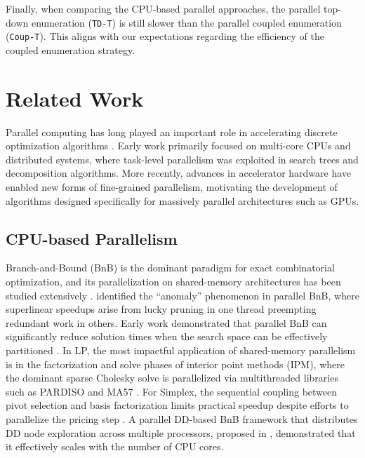\documentclass[letterpaper]{article}
\begin{document}
Finally, when comparing the CPU-based parallel approaches, the parallel top-down enumeration (\texttt{TD-T}) is still slower than the parallel coupled enumeration (\texttt{Coup-T}). This aligns with our expectations regarding the efficiency of the coupled enumeration strategy.

\section{Related Work}
\label{sec:related}
Parallel computing has long played an important role in accelerating discrete optimization algorithms \cite{kindervater1986introduction}.
Early work primarily focused on multi-core CPUs and distributed systems,
where task-level parallelism was exploited in search trees and
decomposition algorithms.
More recently, advances in accelerator hardware have enabled new forms of
fine-grained parallelism, motivating the development of algorithms designed
specifically for massively parallel architectures such as GPUs.

\subsection{CPU-based Parallelism}
Branch-and-Bound (BnB) is the dominant paradigm for exact combinatorial optimization, and its parallelization on shared-memory architectures has been studied extensively \cite{gendron1994parallel, achterberg2009scip}. \cite{lai1984anomalies} identified the ``anomaly'' phenomenon in parallel BnB, where superlinear speedups arise from lucky pruning in one thread preempting redundant work in others. Early work demonstrated that parallel BnB can significantly reduce solution times when the search space can be effectively partitioned \cite{ralphs2003parallel, linderoth2003decomposition}. In LP, the most impactful application of shared-memory parallelism is in the factorization and solve phases of interior point methods (IPM), where the dominant sparse Cholesky solve is parallelized via multithreaded libraries such as PARDISO \cite{schenk2004solving} and MA57 \cite{duff2004ma57}. For Simplex, the sequential coupling between pivot selection and basis factorization limits practical speedup despite efforts to parallelize the pricing step \cite{hall2010towards}. A parallel DD-based BnB framework that distributes DD node exploration across multiple processors, proposed in \cite{bergman2014parallel}, demonstrated that it effectively scales with the number of CPU cores.
\end{document}
